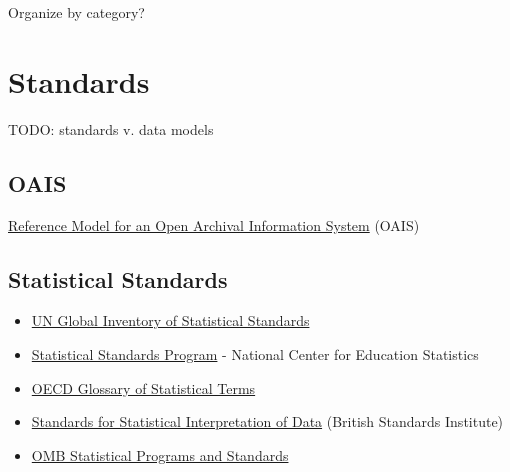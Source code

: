 \begin{remark}
  Organize by category?
\end{remark}

\chapter{Standards}

\begin{ednote}
  TODO: standards v. data models
\end{ednote}

\section{OAIS}
\label{sect:oais}

\href{http://public.ccsds.org/publications/archive/650x0m2.pdf}{Reference
  Model for an Open Archival Information System} (OAIS)

\section{Statistical Standards}
\label{sect:statsstd}

\begin{itemize}
\item \href{http://unstats.un.org/unsd/iiss/List-of-Statistical-Standards.ashx}{UN
  Global Inventory of Statistical Standards}

\item \href{https://nces.ed.gov/statprog/standards.asp}{Statistical Standards Program} - National Center for Education Statistics

\item \href{https://stats.oecd.org/glossary/index.htm}{OECD Glossary of Statistical Terms}

\item \href{http://shop.bsigroup.com/Browse-By-Subject/Quality--Sampling/Full-list-of-statistical-standards/Statistical-interpretation-of-data/}{Standards for Statistical Interpretation of Data} (British Standards Institute)

\item \href{http://www.whitehouse.gov/omb/inforeg_statpolicy}{OMB Statistical Programs and Standards}

\end{itemize}


